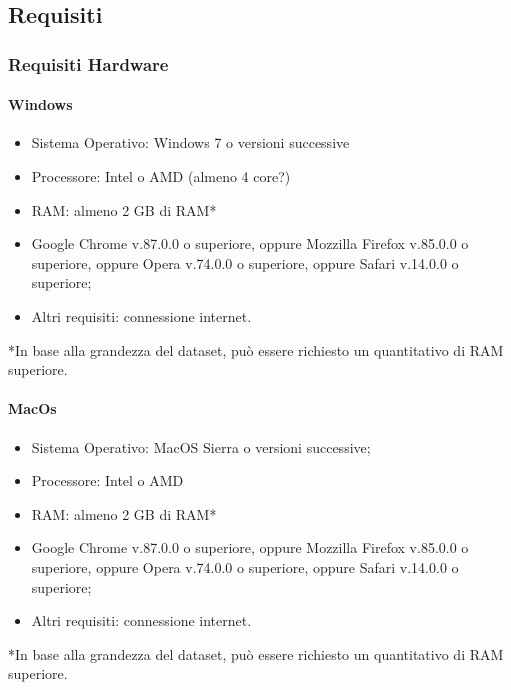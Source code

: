 \documentclass[../manuale_sviluppatore.tex]{subfiles}
\begin{document}
\subsection{Requisiti}
    \label{sec:requisiti}
\subsubsection{Requisiti Hardware}
    \label{subsub:req_h}

\paragraph{Windows}
    \label{par:Windows_req}

\begin{itemize}
    \item Sistema Operativo: Windows 7 o versioni successive
    \item Processore: Intel o AMD (almeno 4 core?)
    \item RAM: almeno 2 GB di RAM*
    \item Google Chrome v.87.0.0 o superiore, oppure Mozzilla Firefox v.85.0.0 o superiore, oppure Opera v.74.0.0 o superiore, oppure Safari v.14.0.0 o superiore;
    \item Altri requisiti: connessione internet.
\end{itemize}

*In base alla grandezza del dataset, può essere richiesto un quantitativo di RAM superiore.

\paragraph{MacOs}
    \label{par:mac_req}

\begin{itemize}
    \item Sistema Operativo: MacOS Sierra o versioni successive;
    \item Processore: Intel o AMD
    \item RAM: almeno 2 GB di RAM*
    \item Google Chrome v.87.0.0 o superiore, oppure Mozzilla Firefox v.85.0.0 o superiore, oppure Opera v.74.0.0 o superiore, oppure Safari v.14.0.0 o superiore;
    \item Altri requisiti: connessione internet.
\end{itemize}

*In base alla grandezza del dataset, può essere richiesto un quantitativo di RAM superiore.
\end{document}
